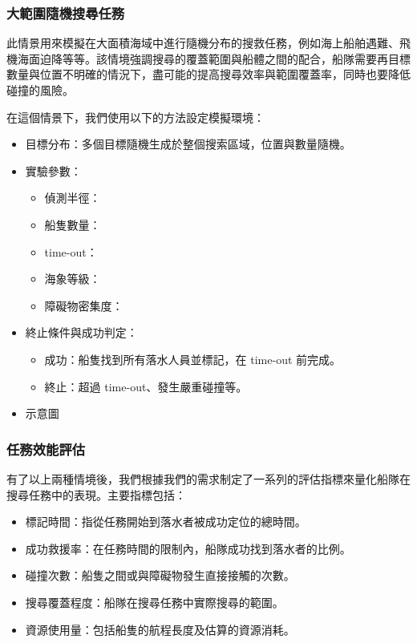 \documentclass[12pt,a4paper]{article}
\begin{document}
\subsubsection{大範圍隨機搜尋任務}
此情景用來模擬在大面積海域中進行隨機分布的搜救任務，例如海上船舶遇難、飛機海面迫降等等。該情境強調搜尋的覆蓋範圍與船體之間的配合，船隊需要再目標數量與位置不明確的情況下，盡可能的提高搜尋效率與範圍覆蓋率，同時也要降低碰撞的風險。
\\ \par
在這個情景下，我們使用以下的方法設定模擬環境：
\begin{itemize}
    \item 目標分布：多個目標隨機生成於整個搜索區域，位置與數量隨機。
    \item 實驗參數：
    \begin{itemize}
        \item 偵測半徑：
        \item 船隻數量：
        \item time-out：
        \item 海象等級：
        \item 障礙物密集度：
    \end{itemize}
    \item 終止條件與成功判定：
    \begin{itemize}
        \item 成功：船隻找到所有落水人員並標記，在 time-out 前完成。
        \item 終止：超過 time-out、發生嚴重碰撞等。
    \end{itemize}
    \item 示意圖
\end{itemize}

\subsubsection{任務效能評估}
有了以上兩種情境後，我們根據我們的需求制定了一系列的評估指標來量化船隊在搜尋任務中的表現。主要指標包括：
\begin{itemize}
    \item 標記時間：指從任務開始到落水者被成功定位的總時間。
    \item 成功救援率：在任務時間的限制內，船隊成功找到落水者的比例。
    \item 碰撞次數：船隻之間或與障礙物發生直接接觸的次數。
    \item 搜尋覆蓋程度：船隊在搜尋任務中實際搜尋的範圍。
    \item 資源使用量：包括船隻的航程長度及估算的資源消耗。
\end{itemize}
\end{document}
